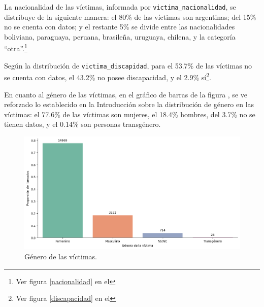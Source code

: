 \documentclass[10 pt]{article}
\begin{document}


La nacionalidad de las víctimas, informada por \texttt{victima\_nacionalidad}, se distribuye de la siguiente manera: el 80\% de las víctimas son argentinas; del 15\% no se cuenta con datos; y el restante 5\% se divide entre las nacionalidades boliviana, paraguaya, peruana, brasileña, uruguaya, chilena, y la categoría “otra”.\footnote{Ver figura \ref{nacionalidad} en el }


Según la distribución de \texttt{victima\_discapidad}, para el 53.7\% de las víctimas no se cuenta con datos, el 43.2\% no posee discapacidad, y el 2.9\% sí\footnote{Ver figura \ref{discapacidad} en el }. 


En cuanto al género de las víctimas, en el gráfico de barras de la figura , se ve reforzado lo establecido en la Introducción sobre la distribución de género en las víctimas: el 77.6\% de las víctimas son mujeres, el 18.4\% hombres, del 3.7\% no se tienen datos, y el 0.14\% son personas transgénero. 

\begin{figure}[H]
    \begin{center}
    \includegraphics[scale=.4]{images/latex_genero_victima.png}
    \caption{Género de las víctimas.}
    \label{genero}
    \end{center}
    \end{figure}
\end{document}
